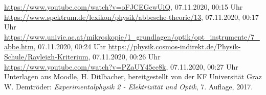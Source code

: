 \documentclass{article}
\begin{document}
\begin{thebibliography}{9}
 \url{https://www.youtube.com/watch?v=oFJCEGcwUiQ}, 07.11.2020, 00:15 Uhr
 \url{https://www.spektrum.de/lexikon/physik/abbesche-theorie/13}, 07.11.2020, 00:17 Uhr
 \url{https://www.univie.ac.at/mikroskopie/1_grundlagen/optik/opt_instrumente/7_abbe.htm}, 07.11.2020, 00:24 Uhr
 \url{https://physik.cosmos-indirekt.de/Physik-Schule/Rayleigh-Kriterium}, 07.11.2020, 00:26 Uhr
 \url{https://www.youtube.com/watch?v=PZaUY45ce8k}, 07.11.2020, 00:27 Uhr
 Unterlagen aus Moodle, H. Ditlbacher, bereitgestellt von der KF Universität Graz
 W. Demtröder: \emph{Experimentalphysik 2 - Elektrizität  und Optik}, 7. Auflage, 2017.
\end{thebibliography}
\end{document}
